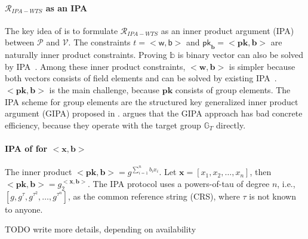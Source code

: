 \paragraph{$\mathcal{R}_{IPA-WTS}$ as an IPA} The key idea of \cite{DBLP:conf/ccs/DasCXNB023} is to formulate $\mathcal{R}_{IPA-WTS}$ as an inner product argument (IPA) between $\mathcal{P}$ and $\mathcal{V}$. The constraints $t=<\mathsf{w},\mathsf{b}>$ and $\mathsf{pk}_{\mathbf{b}} = <\mathbf{pk}, \mathbf{b}>$ are naturally inner product constraints. Proving $\mathbb{b}$ is binary vector can also be solved by IPA~\cite{DBLP:conf/sp/BunzBBPWM18}. Among these inner product constraints, $<\mathbf{w}, \mathbf{b}>$ is simpler because both vectors consists of field elements and can be solved by existing IPA~\cite{DBLP:conf/asiacrypt/CampanelliNRZZ22}. $<\mathbf{pk}, \mathbf{b}>$ is the main challenge, because $\mathbf{pk}$ consists of group elements. The IPA scheme for group elements are the structured key generalized inner product argument (GIPA) proposed in \cite{DBLP:conf/asiacrypt/BunzMMTV21,DBLP:conf/tcc/Lee21}. \cite{DBLP:conf/ccs/DasCXNB023} argues that the GIPA approach has bad concrete efficiency, because they operate with the target group $\mathbb{G}_T$ directly. 

\paragraph{IPA of \cite{DBLP:conf/asiacrypt/CampanelliNRZZ22} for $<\mathbf{x}, \mathbf{b}>$} The inner product $<\mathbf{pk}, \mathbf{b}> = g^{\sum_{i=1}^n b_i x_i}$. Let $\mathbf{x}=[x_1, x_2,\dots, x_n]$, then $<\mathbf{pk}, \mathbf{b}>=g_2^{<\mathbf{x}, \mathbf{b}>}$. The IPA protocol uses a powers-of-tau of degree $n$, i.e., $[g, g^\tau, g^{\tau^2},\dots, g^{\tau^n}]$, as the common reference string (CRS), where $\tau$ is not known to anyone. 

{\color{red} TODO write more details, depending on availability}


